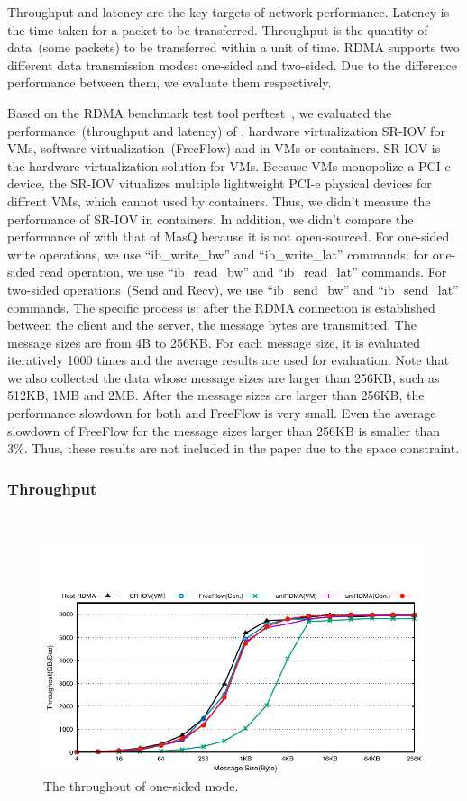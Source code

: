 Throughput and latency are the key targets of network performance. Latency is the time taken for a packet to be transferred. Throughput is the quantity of data~(some packets) to be transferred within a unit of time. RDMA supports two different data transmission modes: one-sided and two-sided. Due to the difference performance between them, we evaluate them respectively.


Based on the RDMA benchmark test tool perftest~\cite{perftest}, we evaluated the performance~(throughput and latency) of \native, hardware virtualization SR-IOV for VMs,  software virtualization~(FreeFlow) and \sys in VMs or containers. SR-IOV is the hardware virtualization solution for VMs. Because VMs monopolize a PCI-e device, the SR-IOV vitualizes multiple lightweight PCI-e physical devices for diffrent VMs, which cannot used by containers. Thus, we didn't measure the performance of SR-IOV in containers. In addition, we didn't compare the performance of \sys with that of MasQ because it is not open-sourced. For one-sided write operations, we use ``ib\_write\_bw'' and ``ib\_write\_lat'' commands; for one-sided read operation, we use ``ib\_read\_bw'' and ``ib\_read\_lat'' commands. For two-sided operations~(Send and Recv), we use ``ib\_send\_bw'' and ``ib\_send\_lat'' commands. The specific process is: after the RDMA connection is established between the client and the server, the message bytes are transmitted. The message sizes are from 4B to 256KB. For each message size,  it is evaluated iteratively 1000 times and the average results are used for evaluation.  Note that we also collected the data whose message sizes are larger than 256KB, such as 512KB, 1MB and 2MB. After the message sizes are larger than 256KB, the performance slowdown for both \sys and FreeFlow is very small. Even the average slowdown of FreeFlow for the message sizes larger than 256KB is smaller than 3\%. Thus, these results are not included in the paper due to the space constraint. 


\subsubsection{\textbf{Throughput}}
\
\noindent

\begin{figure}[!ht]
	\centering
	\includegraphics[width=1.00\linewidth]{images/write-bw.pdf}
	\caption{The throughout of one-sided mode.}
	\label{fig:write-bw}
\end{figure}


